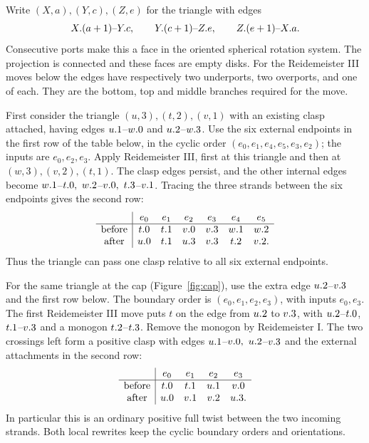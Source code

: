 Write \((X,a),(Y,c),(Z,e)\) for the triangle with edges
\[
 X.(a+1)\text{--}Y.c,\qquad
 Y.(c+1)\text{--}Z.e,\qquad
 Z.(e+1)\text{--}X.a .
\]
Consecutive ports make this a face in the oriented spherical
rotation system. The projection is connected and these faces
are empty disks. For the Reidemeister III moves below the
edges have respectively two underports, two overports, and
one of each. They are the bottom, top and middle branches
required for the move.

First consider the triangle \((u,3),(t,2),(v,1)\) with an
existing clasp attached, having edges
\(u.1\)--\(w.0\) and \(u.2\)--\(w.3\).
Use the six external endpoints in the first row of the table
below, in the cyclic order \((e_0,e_1,e_4,e_5,e_3,e_2)\);
the inputs are \(e_0,e_2,e_3\).
Apply Reidemeister III, first at this triangle and then at
\((w,3),(v,2),(t,1)\). The clasp edges persist, and the other
internal edges become
\(w.1\)--\(t.0,\ w.2\)--\(v.0,\
t.3\)--\(v.1\).
Tracing the three strands between the six endpoints gives the second row:
\[
\begin{array}{c|cccccc}
 &e_0&e_1&e_2&e_3&e_4&e_5\\\hline
 \text{before}&t.0&t.1&v.0&v.3&w.1&w.2\\
 \text{after}&u.0&t.1&u.3&v.3&t.2&v.2 .
\end{array}
\]
Thus the triangle can pass one clasp relative to all six
external endpoints.

For the same triangle at the cap (Figure~\ref{fig:cap}), use the extra edge
\(u.2\)--\(v.3\) and the first row below. The boundary
order is \((e_0,e_1,e_2,e_3)\), with inputs \(e_0,e_3\).
The first Reidemeister III move puts \(t\) on the edge from
\(u.2\) to \(v.3\), with \(u.2\)--\(t.0\),
\(t.1\)--\(v.3\) and a monogon
\(t.2\)--\(t.3\). Remove the monogon by Reidemeister I.
The two crossings left form a positive clasp with edges
\(u.1\)--\(v.0,\ u.2\)--\(v.3\)
and the external attachments in the second row:
\[
\begin{array}{c|cccc}
 &e_0&e_1&e_2&e_3\\\hline
 \text{before}&t.0&t.1&u.1&v.0\\
 \text{after}&u.0&v.1&v.2&u.3 .
\end{array}
\]
In particular this is an ordinary positive full twist between
the two incoming strands. Both local rewrites keep the cyclic
boundary orders and orientations.


